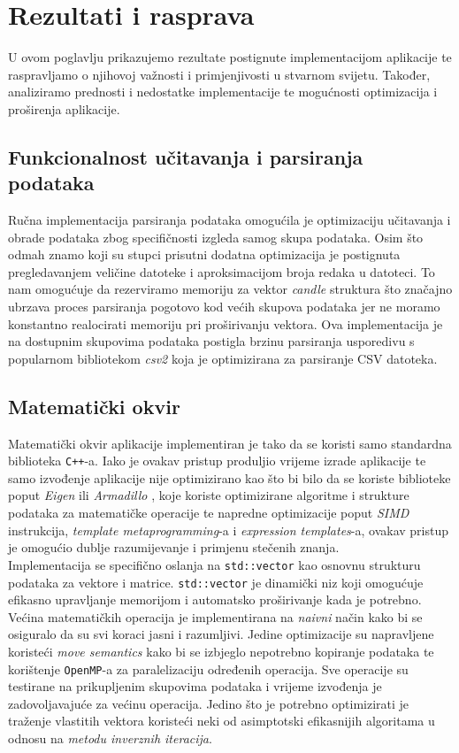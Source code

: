 \documentclass[zavrsnirad, upload]{fer}
\begin{document}
\chapter{Rezultati i rasprava}
\label{pog:rezultati_i_rasprava}
U ovom poglavlju prikazujemo rezultate postignute implementacijom aplikacije
te raspravljamo o njihovoj važnosti i primjenjivosti u stvarnom svijetu.
Također, analiziramo prednosti i nedostatke implementacije te mogućnosti
optimizacija i proširenja aplikacije.
\label{sek:implementacijski_rezultati}
\section{Funkcionalnost učitavanja i parsiranja podataka}
Ručna implementacija parsiranja podataka omogućila je
optimizaciju učitavanja i obrade podataka zbog specifičnosti
izgleda samog skupa podataka. Osim što odmah znamo koji su stupci
prisutni dodatna optimizacija je postignuta pregledavanjem veličine
datoteke i aproksimacijom broja redaka u datoteci. To nam omogućuje
da rezerviramo memoriju za vektor \emph{candle} struktura
što značajno ubrzava proces parsiranja pogotovo kod većih skupova
podataka jer ne moramo konstantno realocirati memoriju pri proširivanju
vektora. Ova implementacija je na dostupnim skupovima podataka
postigla brzinu parsiranja usporedivu s popularnom bibliotekom
\emph{csv2} \cite{csv2} koja je optimizirana za parsiranje CSV datoteka.

\section{Matematički okvir}
\label{sek:matematicki_okvir_rezultati}
Matematički okvir aplikacije implementiran je tako da
se koristi samo standardna biblioteka \texttt{C++}-a. Iako je ovakav pristup
produljio vrijeme izrade aplikacije te samo izvođenje aplikacije
nije optimizirano kao što bi bilo da se koriste biblioteke poput
\emph{Eigen} \cite{Eigen3} ili \emph{Armadillo} \cite{10980539},
koje koriste optimizirane algoritme i strukture podataka za
matematičke operacije te napredne optimizacije poput \emph{SIMD} instrukcija,
\emph{template metaprogramming}-a i \emph{expression templates}-a,
ovakav pristup je omogućio dublje razumijevanje i primjenu
stečenih znanja.\\
Implementacija se specifično oslanja
na \texttt{std::vector} kao osnovnu strukturu podataka za vektore i
matrice. \texttt{std::vector} je dinamički niz koji omogućuje
efikasno upravljanje memorijom i automatsko proširivanje
kada je potrebno.\\
Većina matematičkih operacija je implementirana na \emph{naivni} način
kako bi se osiguralo da su svi koraci jasni i razumljivi. Jedine
optimizacije su napravljene koristeći \emph{move semantics}
kako bi se izbjeglo nepotrebno kopiranje podataka te korištenje
\texttt{OpenMP}-a \cite{660313} za paralelizaciju određenih operacija.
Sve operacije su testirane na prikupljenim skupovima podataka i
vrijeme izvođenja je zadovoljavajuće za većinu operacija. Jedino
što je potrebno optimizirati je traženje vlastitih vektora koristeći
neki od asimptotski efikasnijih algoritama u odnosu na \emph{metodu
inverznih iteracija}.
\end{document}
